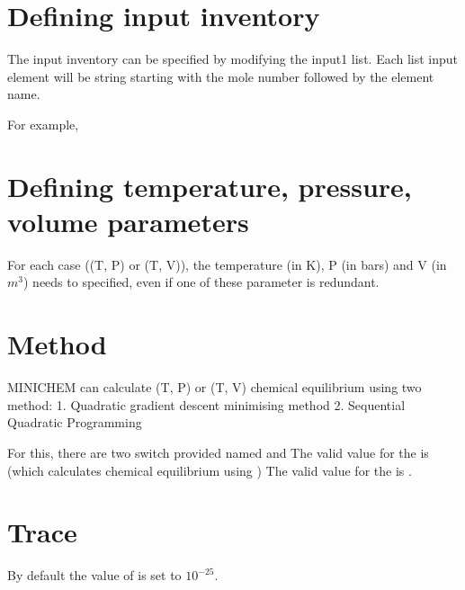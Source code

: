 \documentclass[letterpaper,10pt,english]{sphinxmanual}
\begin{document}
\section{Defining input inventory}
\label{\detokenize{running:defining-input-inventory}}
The input inventory can be specified by modifying the input1 list. Each list input element will be string starting with the mole number followed by the element name.

For example,

\begin{sphinxVerbatim}[commandchars=\\\{\},numbers=left,firstnumber=1,stepnumber=1]
  \PYG{p}{[}  \PYG{p}{]}
\end{sphinxVerbatim}


\section{Defining temperature, pressure, volume parameters}
\label{\detokenize{running:defining-temperature-pressure-volume-parameters}}
For each case ((T, P) or (T, V)), the temperature (in K), P (in bars) and V (in \(m^3\)) needs to specified, even if one of these parameter is redundant.


\section{Method}
\label{\detokenize{running:method}}
MINICHEM can calculate (T, P) or (T, V) chemical equilibrium using two method:
1. Quadratic gradient descent minimising method
2. Sequential Quadratic Programming

For this, there are two switch provided named  and 
\sphinxhyphen{} The valid value for the  is  (which calculates chemical equilibrium using )
\sphinxhyphen{} The valid value for the  is .


\section{Trace}
\label{\detokenize{running:trace}}
By default the value of  is set to \(10^{-25}\).
\end{document}
